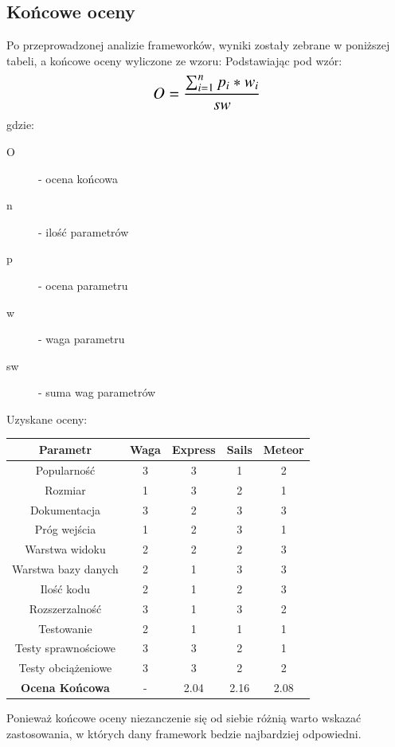 \documentclass[12pt]{report}
\newcommand\setrow[1]{\gdef\rowmac{#1}#1\ignorespaces}
\begin{document}
    \subsection{Końcowe oceny}
      Po przeprowadzonej analizie frameworków, wyniki zostały zebrane w poniższej tabeli, a końcowe oceny wyliczone ze wzoru:
      Podstawiając pod wzór:
      \newline
      \[\text{\Large$O = \frac{\sum_{i=1}^{n} p_{i} * w_{i}}{sw}$}\]
      \newline
      \newline
      gdzie:
      \begin{description}
        \item[O] - ocena końcowa
        \item[n] - ilość parametrów
        \item[p] - ocena parametru
        \item[w] - waga parametru
        \item[sw] - suma wag parametrów
      \end{description}

      Uzyskane oceny:
      \smallskip
        \begin{center}
          \begin{tabular}{ | c | c | c | c | c | }
            \hline
            Parametr & Waga & Express & Sails & Meteor \\
            \hline
            Popularność & 3 & 3 & 1 & 2 \\
            \hline
            Rozmiar & 1 & 3 & 2 & 1 \\
            \hline
            Dokumentacja & 3 & 2 & 3 & 3 \\
            \hline
            Próg wejścia & 1 & 2 & 3 & 1 \\
            \hline
            Warstwa widoku & 2 & 2 & 2 & 3 \\
            \hline
            Warstwa bazy danych & 2 & 1 & 3 & 3 \\
            \hline
            Ilość kodu & 2 & 1 & 2 & 3 \\
            \hline
            Rozszerzalność & 3 & 1 & 3 & 2 \\
            \hline
            Testowanie & 2 & 1 & 1 & 1 \\
            \hline
            Testy sprawnościowe & 3 & 3 & 2 & 1 \\
            \hline
            Testy obciążeniowe & 3 & 3 & 2 & 2 \\
            \hline
            \setrow{\bfseries}Ocena Końcowa & - & 2.04 & 2.16 & 2.08 \\
            \hline
          \end{tabular}
        \end{center}
      \bigskip\medskip
      Ponieważ końcowe oceny niezanczenie się od siebie różnią warto wskazać zastosowania, w których dany framework bedzie najbardziej odpowiedni.
\end{document}
